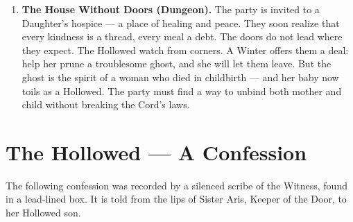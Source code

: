 \documentclass[10pt,twoside]{book}
\begin{document}
\begin{enumerate}
\item \textbf{The House Without Doors (Dungeon).} The party is invited to a Daughter's hospice --- a place of healing and peace. They soon realize that every kindness is a thread, every meal a debt. The doors do not lead where they expect. The Hollowed watch from corners. A Winter offers them a deal: help her prune a troublesome ghost, and she will let them leave. But the ghost is the spirit of a woman who died in childbirth --- and her baby now toils as a Hollowed. The party must find a way to unbind both mother and child without breaking the Cord's laws.
\end{enumerate}

\appendix

\chapter{The Hollowed --- A Confession}

The following confession was recorded by a silenced scribe of the Witness, found in a lead-lined box. It is told from the lips of Sister Aris, Keeper of the Door, to her Hollowed son.
\end{document}

